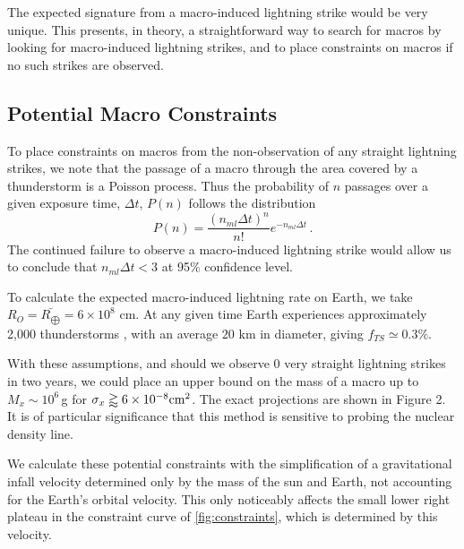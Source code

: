 \documentclass[%
 reprint,
 amsmath,amssymb,
 aps,
]{revtex4-2}
\newcommand{\vtwo}[1]{{\color{red} #1}}
\begin{document}
        The expected signature from a macro-induced lightning strike would be very unique. This presents, in theory, a straightforward way to search for macros by looking for macro-induced lightning strikes, and to place constraints on macros if no such strikes are observed. 


    \subsection{Potential Macro Constraints} %
    \label{sub:macro_constraints_on_earth}

        To place constraints on macros from the non-observation of any straight lightning strikes, we note that the passage of a macro through the area covered by a thunderstorm is a Poisson process. Thus the probability of $n$ passages over a given exposure time, $\Delta t$, $P(n)$ follows the distribution
        \begin{equation}\label{eq:poisson}
            P(n) = \frac{\left({n_{ml} \Delta t}\right)^n}{n!} e^{-n_{ml} \Delta t}\,.
        \end{equation}
        The continued failure to observe a macro-induced lightning strike would allow us to conclude that $n_{ml}\Delta t<3$ at 95$\%$ confidence level.

        To calculate the expected macro-induced lightning rate on Earth, we take $R_{O} = \bar{R_{\bigoplus}} = 6 \times 10^8$ cm. At any given time Earth experiences approximately 2,000 thunderstorms \vtwo{\citep{NatGeo}}, with an average $20$ km in diameter, giving $f_{TS}\simeq 0.3\%$.

        With these assumptions, and should we observe 0 very straight lightning strikes in \vtwo{two} years, we could place an upper bound on the mass of a macro up to $M_x \sim 10^6\,$g for $\sigma_x\gtrapprox6\times10^{-8}{\rm cm}^2$. The exact projections are shown in Figure 2. It is of particular significance that this method is sensitive to probing the nuclear density line.
        
        We calculate these \vtwo{potential} constraints with the simplification of a gravitational infall velocity determined only by the mass of the sun and Earth, not accounting for the Earth's orbital velocity. This only noticeably affects the small lower right plateau in the constraint curve of \ref{fig:constraints}, which is determined by this velocity.
\end{document}
